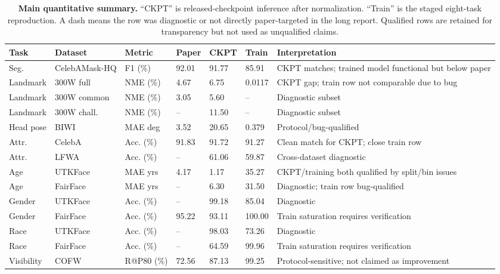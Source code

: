 \begin{table}[!t]
\caption{\textbf{Main quantitative summary.} ``CKPT'' is released-checkpoint inference after normalization. ``Train'' is the staged eight-task reproduction. A dash means the row was diagnostic or not directly paper-targeted in the long report. Qualified rows are retained for transparency but not used as unqualified claims.}
\label{tab:results}
\centering
\scriptsize
\setlength{\tabcolsep}{3pt}
\begin{tabularx}{\textwidth}{p{}p{}p{}p{}p{}p{}Y}
\toprule
Task & Dataset & Metric & Paper & CKPT & Train & Interpretation \\
\midrule
Seg. & CelebAMask-HQ & F1 (\%) & 92.01 & 91.77 & 85.91 & CKPT matches; trained model functional but below paper \\
Landmark & 300W full & NME (\%) & 4.67 & 6.75 & 0.0117 & CKPT gap; train row not comparable due to bug \\
Landmark & 300W common & NME (\%) & 3.05 & 5.60 & -- & Diagnostic subset \\
Landmark & 300W chall. & NME (\%) & -- & 11.50 & -- & Diagnostic subset \\
Head pose & BIWI & MAE deg & 3.52 & 20.65 & 0.379 & Protocol/bug-qualified \\
Attr. & CelebA & Acc. (\%) & 91.83 & 91.72 & 91.27 & Clean match for CKPT; close train row \\
Attr. & LFWA & Acc. (\%) & -- & 61.06 & 59.87 & Cross-dataset diagnostic \\
Age & UTKFace & MAE yrs & 4.17 & 1.17 & 35.27 & CKPT/training both qualified by split/bin issues \\
Age & FairFace & MAE yrs & -- & 6.30 & 31.50 & Diagnostic; train row bug-qualified \\
Gender & UTKFace & Acc. (\%) & -- & 99.18 & 85.04 & Diagnostic \\
Gender & FairFace & Acc. (\%) & 95.22 & 93.11 & 100.00 & Train saturation requires verification \\
Race & UTKFace & Acc. (\%) & -- & 98.03 & 73.26 & Diagnostic \\
Race & FairFace & Acc. (\%) & -- & 64.59 & 99.96 & Train saturation requires verification \\
Visibility & COFW & R@P80 (\%) & 72.56 & 87.13 & 99.25 & Protocol-sensitive; not claimed as improvement \\
\bottomrule
\end{tabularx}
\end{table}


